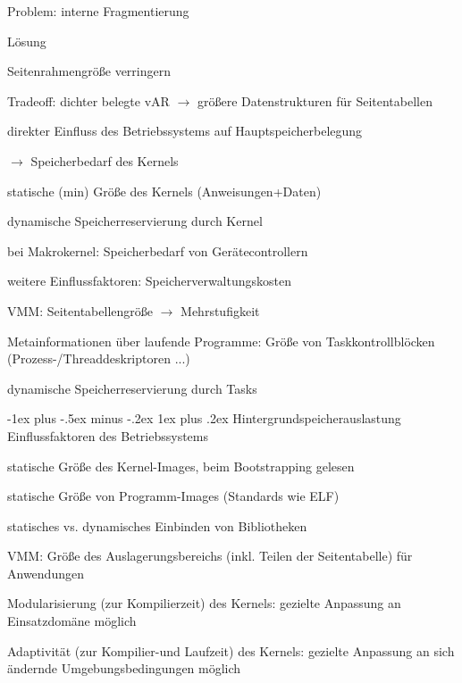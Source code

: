 \documentclass[a4paper]{article}
\makeatletter
\renewcommand{\subsubsection}{\@startsection{subsubsection}{3}{0mm}%
 {-1ex plus -.5ex minus -.2ex}%
 {1ex plus .2ex}%
 {\normalfont\small\bfseries}}
\makeatother
\begin{document}
\begin{multicols}{3}
    Problem: interne Fragmentierung
    \begin{itemize*}
        \item Lösung
        \begin{itemize*}
            \item Seitenrahmengröße verringern
            \item Tradeoff: dichter belegte vAR $\rightarrow$ größere Datenstrukturen für Seitentabellen
        \end{itemize*}
        \item direkter Einfluss des Betriebssystems auf Hauptspeicherbelegung
        \begin{itemize*}
            \item[$\rightarrow$] Speicherbedarf des Kernels
            \item statische (min) Größe des Kernels (Anweisungen+Daten)
            \item dynamische Speicherreservierung durch Kernel
            \item bei Makrokernel: Speicherbedarf von Gerätecontrollern
        \end{itemize*}
    \end{itemize*}

    weitere Einflussfaktoren: Speicherverwaltungskosten
    \begin{itemize*}
        \item VMM: Seitentabellengröße $\rightarrow$ Mehrstufigkeit
        \item Metainformationen über laufende Programme: Größe von Taskkontrollblöcken (Prozess-/Threaddeskriptoren ...)
        \item dynamische Speicherreservierung durch Tasks
    \end{itemize*}

    \subsubsection{Hintergrundspeicherauslastung}
    Einflussfaktoren des Betriebssystems
    \begin{itemize*}
        \item statische Größe des Kernel-Images, beim Bootstrapping gelesen
        \item statische Größe von Programm-Images (Standards wie ELF)
        \item statisches vs. dynamisches Einbinden von Bibliotheken
        \item VMM: Größe des Auslagerungsbereichs (inkl. Teilen der Seitentabelle) für Anwendungen
        \item Modularisierung (zur Kompilierzeit) des Kernels: gezielte Anpassung an Einsatzdomäne möglich
        \item Adaptivität (zur Kompilier-und Laufzeit) des Kernels: gezielte Anpassung an sich ändernde Umgebungsbedingungen möglich
    \end{itemize*}


\end{multicols}
\end{document}
